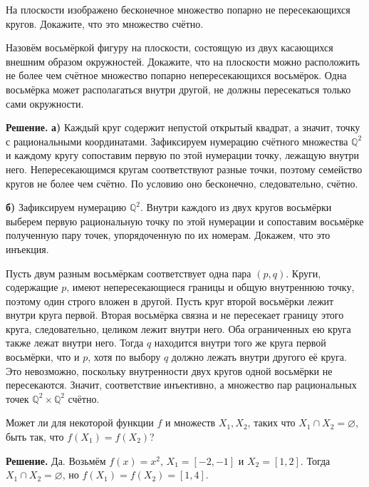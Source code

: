 \begin{problems}
\item
\begin{parts}
  \item На плоскости изображено бесконечное множество попарно не пересекающихся кругов. Докажите, что это множество счётно.
  \item Назовём восьмёркой фигуру на плоскости, состоящую из двух касающихся внешним образом окружностей. Докажите, что на плоскости можно расположить не более чем счётное множество попарно непересекающихся восьмёрок. Одна восьмёрка может располагаться внутри другой, не должны пересекаться только сами окружности.
\end{parts}
\par\smallskip\noindent\textbf{Решение.} \textbf{а)} Каждый круг содержит непустой открытый квадрат, а значит, точку с рациональными координатами. Зафиксируем нумерацию счётного множества $\mathbb Q^2$ и каждому кругу сопоставим первую по этой нумерации точку, лежащую внутри него. Непересекающимся кругам соответствуют разные точки, поэтому семейство кругов не более чем счётно. По условию оно бесконечно, следовательно, счётно.
\par\textbf{б)} Зафиксируем нумерацию $\mathbb Q^2$. Внутри каждого из двух кругов восьмёрки выберем первую рациональную точку по этой нумерации и сопоставим восьмёрке полученную пару точек, упорядоченную по их номерам. Докажем, что это инъекция.
\par Пусть двум разным восьмёркам соответствует одна пара $(p,q)$. Круги, содержащие $p$, имеют непересекающиеся границы и общую внутреннюю точку, поэтому один строго вложен в другой. Пусть круг второй восьмёрки лежит внутри круга первой. Вторая восьмёрка связна и не пересекает границу этого круга, следовательно, целиком лежит внутри него. Оба ограниченных ею круга также лежат внутри него. Тогда $q$ находится внутри того же круга первой восьмёрки, что и $p$, хотя по выбору $q$ должно лежать внутри другого её круга. Это невозможно, поскольку внутренности двух кругов одной восьмёрки не пересекаются. Значит, соответствие инъективно, а множество пар рациональных точек $\mathbb Q^2\times\mathbb Q^2$ счётно.\par

\item Может ли для некоторой функции $f$ и множеств $X_1,X_2$, таких что $X_1\cap X_2=\varnothing$, быть так, что $f(X_1)=f(X_2)$?
\par\smallskip\noindent\textbf{Решение.} Да. Возьмём $f(x)=x^2$, $X_1=[-2,-1]$ и $X_2=[1,2]$. Тогда $X_1\cap X_2=\varnothing$, но $f(X_1)=f(X_2)=[1,4]$.\par


\end{problems}

